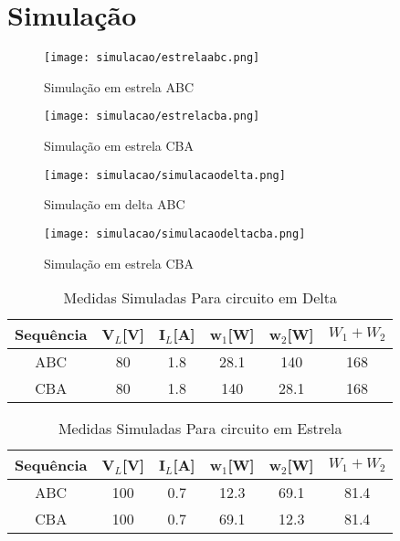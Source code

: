 \documentclass[a4paper, 12pt]{article}
\begin{document}
\newpage
\section{Simulação}
    \justifying
    \begin{figure}[H]
            \centering %
           \texttt{[image: simulacao/estrelaabc.png]}
            \caption{Simulação em estrela ABC}
    \end{figure}
     \begin{figure}[H]
            \centering %
           \texttt{[image: simulacao/estrelacba.png]}
            \caption{Simulação em estrela CBA}
    \end{figure}
     \begin{figure}[H]
            \centering %
           \texttt{[image: simulacao/simulacaodelta.png]}
            \caption{Simulação em delta ABC}
    \end{figure}
     \begin{figure}[H]
            \centering %
           \texttt{[image: simulacao/simulacaodeltacba.png]}
            \caption{Simulação em estrela CBA}
    \end{figure}
     \begin{table}[H]
         \centering
        \begin{tabular}{|c|c|c|c|c|c|}
              \hline %
                  Sequência & V$_L$[V] & I$_L$[A] & w$_1$[W] & w$_2$[W] & $W_1 + W_2$ \\
              \hline %
           ABC & 80 & 1.8 & 28.1 & 140 & 168     \\
              \hline %
           CBA & 80 & 1.8 & 140 & 28.1 & 168     \\
              \hline %
        \end{tabular}
        \caption{Medidas Simuladas  Para circuito em Delta}
    \end{table}

    \begin{table}[H]
         \centering
        \begin{tabular}{|c|c|c|c|c|c|}
              \hline %
                  Sequência & V$_L$[V] & I$_L$[A] & w$_1$[W] & w$_2$[W] & $W_1 + W_2$ \\
              \hline %
           ABC & 100 & 0.7 & 12.3 & 69.1 & 81.4     \\
              \hline %
           CBA & 100 & 0.7 & 69.1 & 12.3 & 81.4     \\
              \hline %
        \end{tabular}
        \caption{Medidas Simuladas Para circuito em Estrela}
    \end{table}
\end{document}
